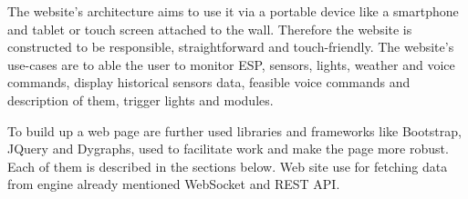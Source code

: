The website's architecture aims to use it via a portable device like a smartphone and tablet or touch screen attached to the wall. Therefore the website is constructed to be responsible, straightforward and touch-friendly. The website's use-cases are to able the user to monitor ESP, sensors, lights, weather and voice commands, display historical sensors data, feasible voice commands and description of them, trigger lights and modules.

To build up a web page are further used libraries and frameworks like Bootstrap, JQuery and Dygraphs, used to facilitate work and make the page more robust. Each of them is described in the sections below. Web site use for fetching data from engine already mentioned WebSocket and REST API. 